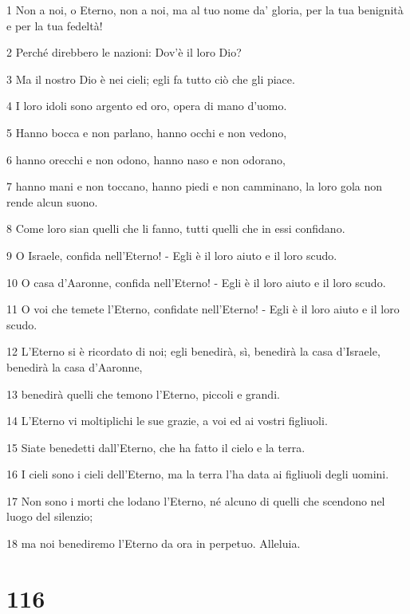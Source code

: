 \par 1 Non a noi, o Eterno, non a noi, ma al tuo nome da' gloria, per la tua benignità e per la tua fedeltà!
\par 2 Perché direbbero le nazioni: Dov'è il loro Dio?
\par 3 Ma il nostro Dio è nei cieli; egli fa tutto ciò che gli piace.
\par 4 I loro idoli sono argento ed oro, opera di mano d'uomo.
\par 5 Hanno bocca e non parlano, hanno occhi e non vedono,
\par 6 hanno orecchi e non odono, hanno naso e non odorano,
\par 7 hanno mani e non toccano, hanno piedi e non camminano, la loro gola non rende alcun suono.
\par 8 Come loro sian quelli che li fanno, tutti quelli che in essi confidano.
\par 9 O Israele, confida nell'Eterno! - Egli è il loro aiuto e il loro scudo.
\par 10 O casa d'Aaronne, confida nell'Eterno! - Egli è il loro aiuto e il loro scudo.
\par 11 O voi che temete l'Eterno, confidate nell'Eterno! - Egli è il loro aiuto e il loro scudo.
\par 12 L'Eterno si è ricordato di noi; egli benedirà, sì, benedirà la casa d'Israele, benedirà la casa d'Aaronne,
\par 13 benedirà quelli che temono l'Eterno, piccoli e grandi.
\par 14 L'Eterno vi moltiplichi le sue grazie, a voi ed ai vostri figliuoli.
\par 15 Siate benedetti dall'Eterno, che ha fatto il cielo e la terra.
\par 16 I cieli sono i cieli dell'Eterno, ma la terra l'ha data ai figliuoli degli uomini.
\par 17 Non sono i morti che lodano l'Eterno, né alcuno di quelli che scendono nel luogo del silenzio;
\par 18 ma noi benediremo l'Eterno da ora in perpetuo. Alleluia.

\chapter{116}

